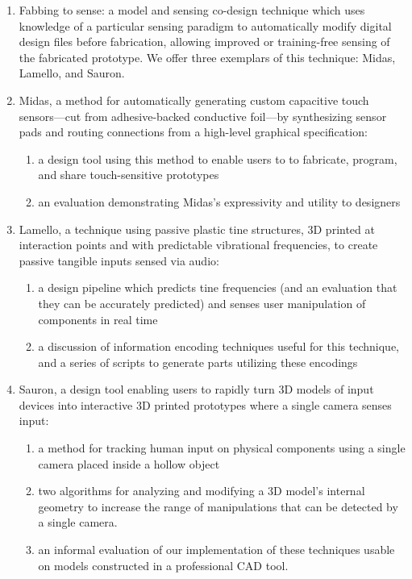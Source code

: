 \begin{enumerate}
\item Fabbing to sense: a model and sensing co-design technique which uses knowledge of a particular sensing paradigm to automatically modify digital design files before fabrication, allowing improved or training-free sensing of the fabricated prototype. We offer three exemplars of this technique: Midas, Lamello, and Sauron.
\item Midas, a method for automatically generating custom capacitive touch sensors---cut from adhesive-backed conductive foil---by synthesizing sensor pads and routing connections from a high-level graphical specification:
\begin{enumerate}
    \item a design tool using this method to enable users to to fabricate, program, and share touch-sensitive prototypes
    \item an evaluation demonstrating Midas's expressivity and utility to designers
    \end{enumerate}
\item Lamello, a technique using passive plastic tine structures, 3D printed at interaction points and with predictable vibrational frequencies, to create passive tangible inputs sensed via audio:
\begin{enumerate}
    \item a design pipeline which predicts tine frequencies (and an evaluation that they can be accurately predicted) and senses user manipulation of components in real time
    \item a discussion of information encoding techniques useful for this technique, and a series of scripts to generate parts utilizing these encodings
    \end{enumerate}
\item Sauron, a design tool enabling users to rapidly turn 3D models of input devices into interactive 3D printed prototypes where a single camera senses input: %
\begin{enumerate}
    \item a method for tracking human input on physical components using a single camera placed inside a hollow object
    \item two algorithms for analyzing and modifying a 3D model's internal geometry to increase the range of manipulations that can be detected by a single camera.
    \item an informal evaluation of our implementation of these techniques usable on models constructed in a professional CAD tool.
    \end{enumerate}
\end{enumerate}